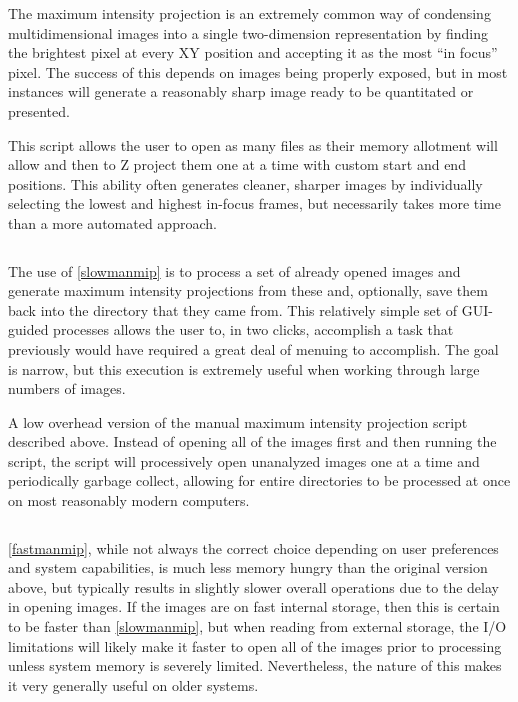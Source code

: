 The maximum intensity projection is an extremely common way of condensing multidimensional images into a single two-dimension representation by finding the brightest pixel at every XY position and accepting it as the most ``in focus'' pixel. The success of this depends on images being properly exposed, but in most instances will generate a reasonably sharp image ready to be quantitated or presented.

\begin{code}
\caption{This script allows the user to open as many files as their memory allotment will allow and then to Z project them one at a time with custom start and end positions. This ability often generates cleaner, sharper images by individually selecting the lowest and highest in-focus frames, but necessarily takes more time than a more automated approach.}
\label{slowmanmip}

\inputminted[breaklines,frame=single,fontsize=\small]{python}{source/manMIPper.py}

\end{code}

The use of \autoref{slowmanmip} is to process a set of already opened images and generate maximum intensity projections from these and, optionally, save them back into the directory that they came from. This relatively simple set of GUI-guided processes allows the user to, in two clicks, accomplish a task that previously would have required a great deal of menuing to accomplish. The goal is narrow, but this execution is extremely useful when working through large numbers of images.

\begin{code}
\caption{A low overhead version of the manual maximum intensity projection script described above. Instead of opening all of the images first and then running the script, the script will processively open unanalyzed images one at a time and periodically garbage collect, allowing for entire directories to be processed at once on most reasonably modern computers.}
\label{fastmanmip}

\inputminted[breaklines,frame=single,fontsize=\small]{python}{source/fast_manMIPper.py}

\end{code}

\autoref{fastmanmip}, while not always the correct choice depending on user preferences and system capabilities, is much less memory hungry than the original version above, but typically results in slightly slower overall operations due to the delay in opening images. If the images are on fast internal storage, then this is certain to be faster than \autoref{slowmanmip}, but when reading from external storage, the I/O limitations will likely make it faster to open all of the images prior to processing unless system memory is severely limited. Nevertheless, the nature of this makes it very generally useful on older systems.

